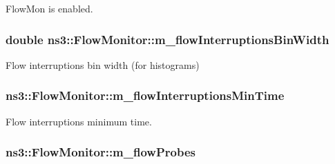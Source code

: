 Flow\+Mon is enabled. 

\subsubsection[{\texorpdfstring{m\+\_\+flow\+Interruptions\+Bin\+Width}{m_flowInterruptionsBinWidth}}]{\setlength{\rightskip}{0pt plus 5cm}double ns3\+::\+Flow\+Monitor\+::m\+\_\+flow\+Interruptions\+Bin\+Width\hspace{0.3cm}{\ttfamily [private]}}\hypertarget{classns3_1_1FlowMonitor_a3a4a61e0ec306d29b8f37fdecd81ad16}{}\label{classns3_1_1FlowMonitor_a3a4a61e0ec306d29b8f37fdecd81ad16}


Flow interruptions bin width (for histograms) 

\subsubsection[{\texorpdfstring{m\+\_\+flow\+Interruptions\+Min\+Time}{m_flowInterruptionsMinTime}}]{ ns3\+::\+Flow\+Monitor\+::m\+\_\+flow\+Interruptions\+Min\+Time\hspace{0.3cm}{\ttfamily [private]}}\hypertarget{classns3_1_1FlowMonitor_a6d2163354ea89ab71ff2b573502c66b5}{}\label{classns3_1_1FlowMonitor_a6d2163354ea89ab71ff2b573502c66b5}


Flow interruptions minimum time. 

\subsubsection[{\texorpdfstring{m\+\_\+flow\+Probes}{m_flowProbes}}]{ ns3\+::\+Flow\+Monitor\+::m\+\_\+flow\+Probes\hspace{0.3cm}{\ttfamily [private]}}\hypertarget{classns3_1_1FlowMonitor_a0314b0765cde07cbe496de63e663b007}{}\label{classns3_1_1FlowMonitor_a0314b0765cde07cbe496de63e663b007}


